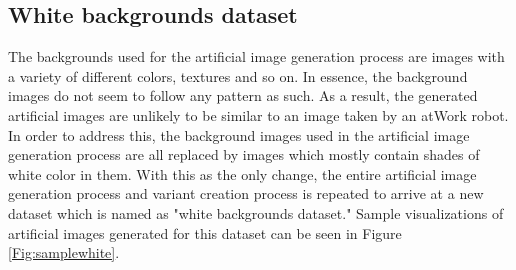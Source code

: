 	\subsection{White backgrounds dataset}
	\label{section:white}
The backgrounds used for the artificial image generation process are images with a variety of different colors, textures and so on. In essence, the background images do not seem to follow any pattern as such. As a result, the generated artificial images are unlikely to be similar to an image taken by an atWork robot. In order to address this, the background images used in the artificial image generation process are all replaced by images which mostly contain shades of white color in them. With this as the only change, the entire artificial image generation process and variant creation process is repeated to arrive at a new dataset which is named as "white backgrounds dataset." Sample visualizations of artificial images generated for this dataset can be seen in Figure \ref{Fig:samplewhite}.

